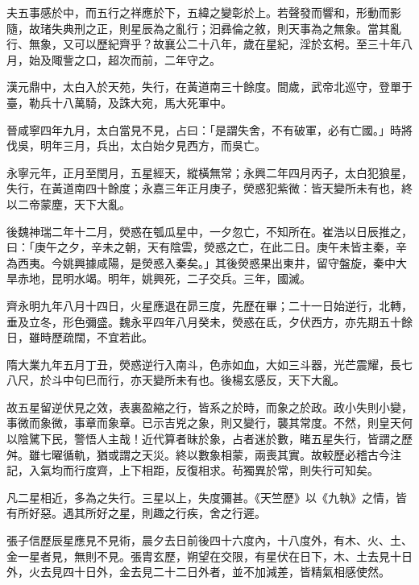 \begin{pinyinscope}
 夫五事感於中，而五行之祥應於下，五緯之變彰於上。若聲發而響和，形動而影隨，故琽失典刑之正，則星辰為之亂行；汩彞倫之敘，則天事為之無象。當其亂行、無象，又可以歷紀齊乎？故襄公二十八年，歲在星紀，淫於玄枵。至三十年八月，始及陬訾之口，超次而前，二年守之。



 漢元鼎中，太白入於天苑，失行，在黃道南三十餘度。間歲，武帝北巡守，登單于臺，勒兵十八萬騎，及誅大宛，馬大死軍中。



 晉咸寧四年九月，太白當見不見，占曰：「是謂失舍，不有破軍，必有亡國。」時將伐吳，明年三月，兵出，太白始夕見西方，而吳亡。



 永寧元年，正月至閏月，五星經天，縱橫無常；永興二年四月丙子，太白犯狼星，失行，在黃道南四十餘度；永嘉三年正月庚子，熒惑犯紫微：皆天變所未有也，終以二帝蒙塵，天下大亂。



 後魏神瑞二年十二月，熒惑在瓠瓜星中，一夕忽亡，不知所在。崔浩以日辰推之，曰：「庚午之夕，辛未之朝，天有陰雲，熒惑之亡，在此二日。庚午未皆主秦，辛為西夷。今姚興據咸陽，是熒惑入秦矣。」其後熒惑果出東井，留守盤旋，秦中大旱赤地，昆明水竭。明年，姚興死，二子交兵。三年，國滅。



 齊永明九年八月十四日，火星應退在昴三度，先歷在畢；二十一日始逆行，北轉，垂及立冬，形色彌盛。魏永平四年八月癸未，熒惑在氐，夕伏西方，亦先期五十餘日，雖時歷疏闊，不宜若此。



 隋大業九年五月丁丑，熒惑逆行入南斗，色赤如血，大如三斗器，光芒震耀，長七八尺，於斗中句巳而行，亦天變所未有也。後楊玄感反，天下大亂。



 故五星留逆伏見之效，表裏盈縮之行，皆系之於時，而象之於政。政小失則小變，事微而象微，事章而象章。已示吉兇之象，則又變行，襲其常度。不然，則皇天何以陰騭下民，警悟人主哉！近代算者昧於象，占者迷於數，睹五星失行，皆謂之歷舛。雖七曜循軌，猶或謂之天災。終以數象相蒙，兩喪其實。故較歷必稽古今注記，入氣均而行度齊，上下相距，反復相求。茍獨異於常，則失行可知矣。



 凡二星相近，多為之失行。三星以上，失度彌甚。《天竺歷》以《九執》之情，皆有所好惡。遇其所好之星，則趣之行疾，舍之行遲。



 張子信歷辰星應見不見術，晨夕去日前後四十六度內，十八度外，有木、火、土、金一星者見，無則不見。張胄玄歷，朔望在交限，有星伏在日下，木、土去見十日外，火去見四十日外，金去見二十二日外者，並不加減差，皆精氣相感使然。




\end{pinyinscope}
